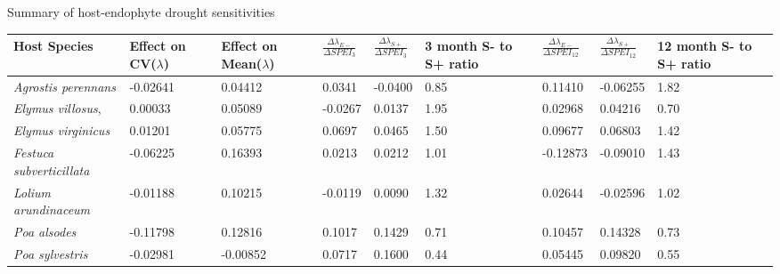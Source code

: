 \documentclass[12pt]{article}
\begin{document}
 Summary of host-endophyte drought sensitivities\\
\begin{table}[ht]
	\begin{adjustbox}{width=1\textwidth}{
			\begin{tabular}{|p{4cm}| p{2cm} |p{2cm}|p{2cm}|p{2cm}| p{2cm}|p{2cm}|p{2cm}|p{2cm}|}
				\hline
				\bf{Host Species} & \bf{Effect on CV($\lambda$)}& \bf{Effect on Mean($\lambda$)}&$\frac{\Delta\lambda_{E-}}{\Delta SPEI_{3}}$ & $\frac{\Delta\lambda_{S+}}{\Delta SPEI_{3}}$ &\bf{3 month S- to S+ ratio}&$\frac{\Delta\lambda_{E-}}{\Delta SPEI_{12}}$ &$\frac{\Delta\lambda_{S+}}{\Delta SPEI_{12}}$ &\bf{12 month S- to S+ ratio}\\
				\hline
				\emph{Agrostis perennans} &-0.02641&0.04412&0.0341&-0.0400&0.85&0.11410&-0.06255&1.82\\
				\emph{Elymus villosus}, &0.00033&0.05089&-0.0267&0.0137&1.95&0.02968&0.04216&0.70\\
				\emph{Elymus virginicus} &0.01201&0.05775&0.0697&0.0465&1.50&0.09677&0.06803&1.42\\
				\emph{Festuca subverticillata} &-0.06225&0.16393&0.0213&0.0212&1.01&-0.12873&-0.09010&1.43\\
				\emph{Lolium arundinaceum} &-0.01188&0.10215&-0.0119&0.0090&1.32&0.02644&-0.02596&1.02\\
				\emph{Poa alsodes} &-0.11798&0.12816&0.1017&0.1429&0.71&0.10457&0.14328&0.73\\
				\emph{Poa sylvestris}&-0.02981&-0.00852&0.0717&0.1600&0.44&0.05445&0.09820&0.55\\
				\hline
		\end{tabular}}
	\end{adjustbox}
\end{table}
\end{document}
